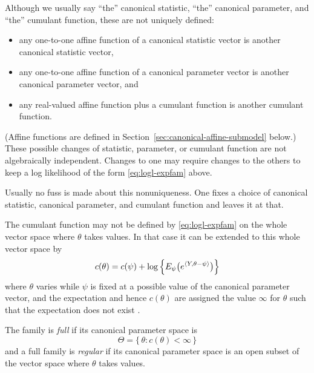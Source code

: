 Although we usually say ``the'' canonical statistic,
``the'' canonical parameter, and ``the'' cumulant function,
these are not uniquely defined:
\begin{itemize}
\item any one-to-one affine function of a canonical statistic vector is another
   canonical statistic vector,
\item any one-to-one affine function of a canonical parameter vector is another
   canonical parameter vector, and
\item any real-valued affine function plus a cumulant function is another
   cumulant function.
\end{itemize}
(Affine functions are defined in Section~\ref{sec:canonical-affine-submodel}
below.)
These possible changes of statistic, parameter, or cumulant function are not
algebraically independent.  Changes to one may require changes to the others
to keep a log likelihood of the form \eqref{eq:logl-expfam} above.

Usually no fuss is made about this nonuniqueness.  One fixes a choice
of canonical statistic, canonical parameter, and cumulant function
and leaves it at that.

The cumulant function may not be defined by \eqref{eq:logl-expfam}
on the whole vector space where $\theta$ takes values.  In that case
it can be extended to this whole vector space by
\begin{equation} \label{eq:cumfun-expfam}
   c(\theta) = c(\psi) + \log\left\{
   E_\psi\bigl( e^{\langle Y, \theta - \psi \rangle} \bigr) \right\}
\end{equation}
where $\theta$ varies while $\psi$ is fixed at
a possible value of the canonical parameter vector, and
the expectation and hence $c(\theta)$ are assigned
the value $\infty$ for $\theta$ such that the expectation does not exist
\citep[equation (5)]{geyer-gdor}.

The family is \emph{full} if its canonical parameter space is
\begin{equation} \label{eq:full-expfam}
   \Theta = \{\, \theta : c(\theta) < \infty \,\}
\end{equation}
and a full family is \emph{regular} if its canonical parameter space is an open
subset of the vector space where $\theta$ takes values.

